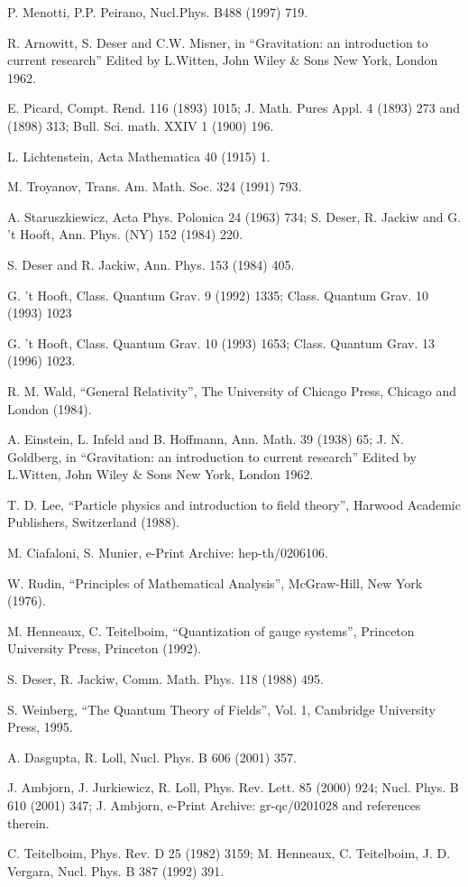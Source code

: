 \documentclass[a4paper,12pt]{article}
\begin{document}
\begin{thebibliography}{}
  P. Menotti, P.P. Peirano,
Nucl.Phys. B488 (1997) 719.

 R. Arnowitt, S. Deser and C.W. Misner, in ``Gravitation:
an introduction to current research'' Edited by L.Witten, John Wiley
\& Sons New York, London 1962.
 
 E. Picard, Compt. Rend. 116 (1893) 1015;
J. Math. Pures Appl. 4 (1893) 273 and (1898) 313;
Bull. Sci. math. XXIV 1 (1900) 196. 

 L. Lichtenstein, Acta Mathematica 40 (1915) 1.
 
 M. Troyanov, Trans. Am. Math. Soc. 324 (1991) 793. 

 A. Staruszkiewicz, Acta Phys. Polonica 24 (1963)
734; S. Deser, R. Jackiw and G. 't Hooft, Ann. Phys. (NY) 152
(1984) 220.

 S. Deser and R. Jackiw, Ann. Phys. 153 (1984)
405.

 G. 't Hooft, Class. Quantum Grav. 9 (1992) 1335;
Class. Quantum Grav. 10 (1993) 1023 

 G. 't Hooft, Class. Quantum Grav. 10 (1993) 1653;
Class. Quantum Grav. 13 (1996) 1023. 


 R. M. Wald, ``General Relativity'', The University of
Chicago Press, Chicago and London (1984). 

 A. Einstein, L. Infeld and B. Hoffmann, Ann. Math. 39
(1938) 65; J. N. Goldberg, in ``Gravitation: an introduction to current
research'' Edited by L.Witten, John Wiley \& Sons New York, London
1962.      

 T. D. Lee, ``Particle physics and introduction to field
theory'', Harwood  Academic Publishers, Switzerland (1988).

 M. Ciafaloni, S. Munier, e-Print
Archive: hep-th/0206106.

 W. Rudin, ``Principles of Mathematical Analysis'',
McGraw-Hill, New York (1976).

 M. Henneaux, C. Teitelboim, ``Quantization of gauge
systems'', Princeton University Press, Princeton (1992).

 S. Deser, R. Jackiw, Comm. Math. Phys. 118
(1988) 495.   

 S. Weinberg, ``The Quantum Theory of Fields'', Vol.
1, Cambridge University Press, 1995.

 A. Dasgupta, R. Loll, Nucl. Phys. B 606 (2001) 357.

 J. Ambjorn, J. Jurkiewicz, R. Loll,
Phys. Rev. Lett. 85 (2000) 924; Nucl. Phys. B 610 (2001) 347;
J. Ambjorn, e-Print Archive: gr-qc/0201028 and references therein.

 C. Teitelboim, Phys. Rev. D 25 (1982) 3159;
M. Henneaux, C. Teitelboim, J. D. Vergara, Nucl. Phys. B 387 (1992)
391.

\end{thebibliography}
\end{document}
